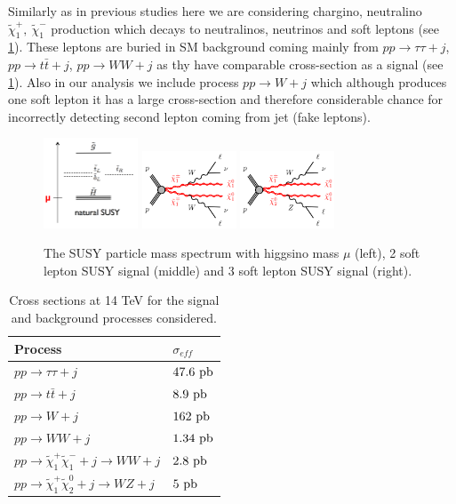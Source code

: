 \documentclass[tightenline,notitlepage,nofootinbib]{revtex4-1}
\begin{document}
Similarly as in previous studies \cite{PhysRevD.89.075007} here we are considering chargino, neutralino $\tilde \chi_1^{+},~\tilde \chi_1^{-}$ production which decays to neutralinos, neutrinos and soft leptons (see \cref{fig:basic}). These leptons are buried in SM background coming mainly from $pp\to \tau \tau + j$, $pp\to t \bar t + j$, $pp \to WW + j$ as thy have comparable cross-section as a signal (see \cref{tab:cross}). Also in our analysis we include process $pp \to W +j$ which although produces one soft lepton it has a large cross-section and therefore considerable chance for incorrectly detecting second lepton coming from jet (fake leptons). 
\begin{figure}[!ht]
    \centering
    \includegraphics[width=0.25\textwidth]{splittings.png}
    \includegraphics[width=0.25\textwidth]{C1C1.png}
    \includegraphics[width=0.25\textwidth]{C1N2.png}
    \caption{The SUSY particle mass spectrum with higgsino mass $\mu$ (left), 2 soft lepton SUSY signal (middle) and 3 soft lepton SUSY signal (right).}
    \label{fig:basic}
  \end{figure}

\begin{table}[!ht]
  \centering
  \begin{tabular}{ll}
    Process & $\sigma_{eff}$ \\
    \hline
    $pp\rightarrow \tau \tau + j$ & $47.6~\rm{pb}$\\
    $pp\rightarrow t \bar t + j$ & $ 8.9~\rm{pb}$\\
    $pp \rightarrow W + j$ &  $162~\rm{pb}$ \\
    $pp \rightarrow WW +j$ & $1.34~\rm{pb}$\\
    $pp \rightarrow \tilde \chi_1^{+}\tilde \chi_1^{-} + j \rightarrow WW + j$ & $2.8~\rm{pb}$\\
    $pp \rightarrow \tilde \chi_1^{+}\tilde \chi_2^{0} + j \rightarrow WZ + j$ & $5~\rm{pb}$\\
  \end{tabular}
  \caption{Cross sections at 14 TeV for the signal and background processes considered.}
  \label{tab:cross}
\end{table}
\end{document}
